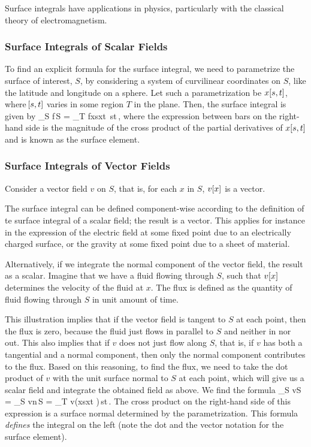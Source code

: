 Surface integrals have applications in physics, particularly with the classical theory of electromagnetism.


\subsubsection{Surface Integrals of Scalar Fields}
To find an explicit formula for the surface integral, we need to parametrize the surface of interest, $S$, by considering a system of curvilinear coordinates on $S$, like the latitude and longitude on a sphere. Let such a parametrization be $x\!\left[{s,t}\right]$, where $\!\left[{s,t}\right]$ varies in some region $T$ in the plane. Then, the surface integral is given by
\beq
\int_S f\,\dx S = \iint_T f\biggl\vert \xpd xs\cprod\xpd xt \biggr\vert\,\dx s\dx t\,,
\eeq
where the expression between bars on the right-hand side is the magnitude of the cross product of the partial derivatives of $x\!\left[{s,t}\right]$ and is known as the surface element.


\subsubsection{Surface Integrals of Vector Fields}
Consider a vector field $v$ on $S$, that is, for each $x$ in $S$, $v\!\left[{x}\right]$ is a vector.

The surface integral can be defined component-wise according to the definition of te surface integral of a scalar field; the result is a vector. This applies for instance in the expression of the electric field at some fixed point due to an electrically charged surface, or the gravity at some fixed point due to a sheet of material.

Alternatively, if we integrate the normal component of the vector field, the result as a scalar. Imagine that we have a fluid flowing through $S$, such that $v\!\left[{x}\right]$ determines the velocity of the fluid at $x$. The flux is defined as the quantity of fluid flowing through $S$ in unit amount of time.

This illustration implies that if the vector field is tangent to $S$ at each point, then the flux is zero, because the fluid just flows in parallel to $S$ and neither in nor out. This also implies that if $v$ does not just flow along $S$, that is, if $v$ has both a tangential and a normal component, then only the normal component contributes to the flux. Based on this reasoning, to find the flux, we need to take the dot product of $v$ with the unit surface normal to $S$ at each point, which will give us a scalar field and integrate the obtained field as above. We find the formula
\beq
\int_S v\iprod\dx S = \int_S v\iprod n\,\dx S 
                    = \iint_T v\iprod \left(\xpd xs\cprod\xpd xt \right)\,\dx s\dx t\,.
\eeq
The cross product on the right-hand side of this expression is a surface normal determined by the parametrization. This formula \emph{defines} the integral on the left (note the dot and the vector notation for the surface element).


